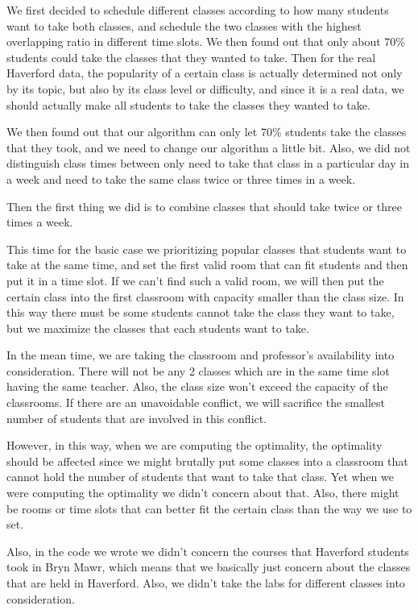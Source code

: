 \documentclass[11pt, oneside]{article}   	%
\begin{document}
We first decided to schedule different classes according to how many students want to take both classes, and schedule the two classes with the highest overlapping ratio in different time slots. We then found out that only about 70\% students could take the classes that they wanted to take. Then for the real Haverford data, the popularity of a certain class is actually determined not only by its topic, but also by its class level or difficulty, and since it is a real data, we should actually make all students to take the classes they wanted to take. 

We then found out that our algorithm can only let 70\% students take the classes that they took, and we need to change our algorithm a little bit. Also, we did not distinguish class times between only need to take that class in a particular day in a week and need to take the same class twice or three times in a week. 

Then the first thing we did is to combine classes that should take twice or three times a week.


This time for the basic case we prioritizing popular classes that students want to take at the same time, and set the first valid room that can fit students and then put it in a time slot. If we can't find such a valid room, we will then put the certain class into the first classroom with capacity smaller than the class size. In this way there must be some students cannot take the class they want to take, but we maximize the classes that each students want to take.

In the mean time, we are taking the classroom and professor's availability into consideration. There will not be any 2 classes which are in the same time slot having the same teacher. Also, the class size won't exceed the capacity of the classrooms. If there are an unavoidable conflict, we will sacrifice the smallest number of students that are involved in this conflict.

However, in this way, when we are computing the optimality, the optimality should be affected since we might brutally put some classes into a classroom that cannot hold the number of students that want to take that class. Yet when we were computing the optimality we didn't concern about that. Also, there might be rooms or time slots that can better fit the certain class than the way we use to set. %

Also, in the code we wrote we didn't concern the courses that Haverford students took in Bryn Mawr, which means that we basically just concern about the classes that are held in Haverford. Also, we didn't take the labs for different classes into consideration.
\end{document}
